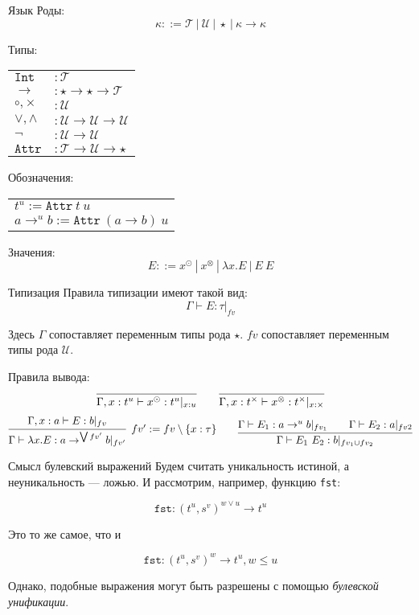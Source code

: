 \documentclass[aspectratio=169,dvipsnames,usenames]{beamer}
\begin{document}
\begin{frame}{Язык}
Роды:
$$\kappa ::= \mathcal{T}\ |\ \mathcal{U}\ |\ \star\ |\ \kappa\rightarrow\kappa$$

Типы:
\begin{center}\begin{tabular}{ll}
$\texttt{Int}$ & $: \mathcal{T}$\\
$\rightarrow$ & $: \star\rightarrow\star\rightarrow\mathcal{T}$\\
$\circ,\times$ & $: \mathcal{U}$\\
$\vee,\wedge$ & $: \mathcal{U}\rightarrow\mathcal{U}\rightarrow\mathcal{U}$\\
$\neg$ & $: \mathcal{U}\rightarrow\mathcal{U}$\\
$\texttt{Attr}$ & $: \mathcal{T}\rightarrow\mathcal{U}\rightarrow\star$
\end{tabular}\end{center}

Обозначения:
\begin{center}\begin{tabular}{l}
$t^u := \texttt{Attr}\ t\ u$\\
$a \rightarrow^u b := \texttt{Attr}\ (a\rightarrow b)\ u$
\end{tabular}\end{center}

Значения:
$$E ::= x^\odot\ |\ x^\otimes\ |\ \lambda x.E\ |\ E\ E$$
\end{frame}

\begin{frame}{Типизация}
Правила типизации имеют такой вид:
$$\Gamma\vdash E:\tau|_{fv}$$

Здесь $\Gamma$ сопоставляет переменным типы рода $\star$.
$fv$ сопоставляет переменным типы рода $\mathcal{U}$.

Правила вывода:
$$\infer{\Gamma,x:t^u\vdash x^\odot:t^u|_{x:u}}{}\quad\quad\infer{\Gamma,x:t^\times\vdash x^\otimes:t^\times|_{x:\times}}{}$$
$$\infer[fv' := fv\setminus\{x:\tau\}]{\Gamma\vdash\lambda x.E:a \rightarrow^{\bigvee fv'} b|_{fv'}}{\Gamma,x:a\vdash E:b|_{fv}}\quad\quad
  \infer{\Gamma\vdash E_1\ E_2:b|_{fv_1\cup fv_2}}{\Gamma\vdash E_1:a\rightarrow^u b|_{fv_1}\quad\quad\Gamma\vdash E_2:a|_{fv2}}$$
\end{frame}

\begin{frame}[fragile]{Смысл булевский выражений}
Будем считать уникальность истиной, а неуникальность --- ложью.
И рассмотрим, например, функцию \verb!fst!:

$$\texttt{fst} : (t^u, s^v)^{w\vee u} \rightarrow t^u$$

Это то же самое, что и

$$\texttt{fst} : (t^u, s^v)^w \rightarrow t^u, w \le u$$

Однако, подобные выражения могут быть разрешены с помощью \emph{булевской унификации}.
\end{frame}
\end{document}
